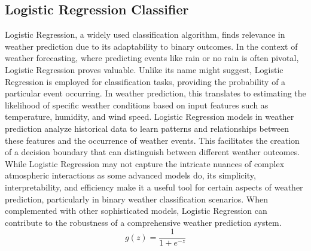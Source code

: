 \documentclass[conference]{IEEEtran}
\begin{document}
\subsection{\textbf{Logistic Regression Classifier}}
Logistic Regression, a widely used classification algorithm, finds relevance in weather prediction due to its adaptability to binary outcomes. In the context of weather forecasting, where predicting events like rain or no rain is often pivotal, Logistic Regression proves valuable. Unlike its name might suggest, Logistic Regression is employed for classification tasks, providing the probability of a particular event occurring. In weather prediction, this translates to estimating the likelihood of specific weather conditions based on input features such as temperature, humidity, and wind speed. Logistic Regression models in weather prediction analyze historical data to learn patterns and relationships between these features and the occurrence of weather events. This facilitates the creation of a decision boundary that can distinguish between different weather outcomes. While Logistic Regression may not capture the intricate nuances of complex atmospheric interactions as some advanced models do, its simplicity, interpretability, and efficiency make it a useful tool for certain aspects of weather prediction, particularly in binary weather classification scenarios. When complemented with other sophisticated models, Logistic Regression can contribute to the robustness of a comprehensive weather prediction system.
\\ \[ g(z) = \frac{1}{1 + e^{-z}} \]
\end{document}
